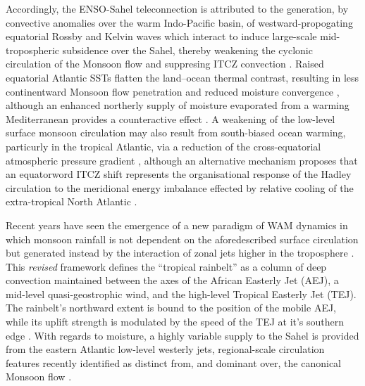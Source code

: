 \documentclass[a4paper]{article}
\begin{document}
Accordingly, the ENSO-Sahel teleconnection is attributed to the generation, by convective anomalies over the warm Indo-Pacific basin, of westward-propogating equatorial Rossby and Kelvin waves which interact to induce large-scale mid-tropospheric subsidence over the Sahel, thereby weakening the cyclonic circulation of the Monsoon flow and suppresing ITCZ convection \parencite{shinoda1994tropical, goddard1999importance, rowell2001teleconnections, janicot2001intra, lu2005oceanic}.
Raised equatorial Atlantic SSTs flatten the land--ocean thermal contrast, resulting in less continentward Monsoon flow penetration and reduced moisture convergence \parencite{vizy2002development, giannini2003oceanic, losada2010multi}, although an enhanced northerly supply of moisture evaporated from a warming Mediterranean provides a counteractive effect \parencite{rowell2003impact, gaetani2010influence}.
A weakening of the low-level surface monsoon circulation may also result from south-biased ocean warming, particurly in the tropical Atlantic, via a reduction of the cross-equatorial atmospheric pressure gradient \parencite{lu2005oceanic, chung2007relationship, biasutti2006robust, zhang2006impact}, although an alternative mechanism proposes that an equatorword ITCZ shift represents the organisational response of the Hadley circulation to the meridional energy imbalance effected by relative cooling of the extra-tropical North Atlantic \parencite{broccoli2006response, hwang2013anthropogenic}. 

Recent years have seen the emergence of a new paradigm of WAM dynamics in which monsoon rainfall is not dependent on the aforedescribed surface circulation \parencite{grist2001study} but generated instead by the interaction of zonal jets higher in the troposphere \parencite[see][for a comprehensive overview]{nicholson2009revised}.
This \emph{revised} framework defines the ``tropical rainbelt'' as a column of deep convection maintained between the axes of the African Easterly Jet (AEJ), a mid-level quasi-geostrophic wind, and the high-level Tropical Easterly Jet (TEJ).
The rainbelt's northward extent is bound to the position of the mobile AEJ, while its uplift strength is modulated by the speed of the TEJ at it's southern edge \parencite{gu2004seasonal, nicholson2009revised, nicholson2013west}.
With regards to moisture, a highly variable supply to the Sahel is provided from the eastern Atlantic low-level westerly jets, regional-scale circulation features recently identified as distinct from, and dominant over, the canonical Monsoon flow \parencite{grodsky2003near, pu2010dynamics, nicholson2013west}.
\end{document}
